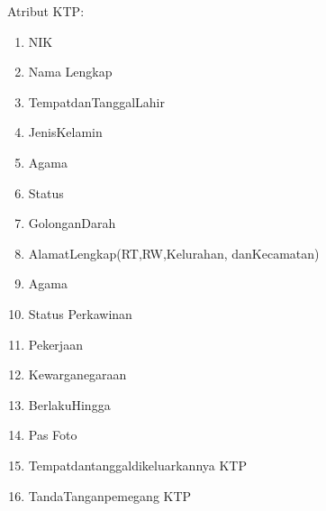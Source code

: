 \documentclass[12pt,a4paper,bahasa]{article}
\begin{document}
	Atribut KTP:\\
	\begin{enumerate}
	\item NIK
	\item Nama Lengkap
	\item TempatdanTanggalLahir
	\item JenisKelamin
	\item Agama 
	\item Status
	\item GolonganDarah
	\item AlamatLengkap(RT,RW,Kelurahan, danKecamatan)
	\item Agama
	\item Status Perkawinan
	\item Pekerjaan
	\item Kewarganegaraan
	\item BerlakuHingga
	\item Pas Foto
	\item Tempatdantanggaldikeluarkannya KTP
	\item TandaTanganpemegang KTP
	\end{enumerate}
	
\end{document}
